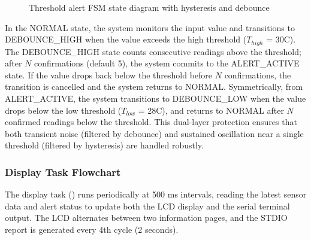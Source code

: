 \begin{figure}[H]
\centering
{}
\caption{Threshold alert FSM state diagram with hysteresis and debounce}
\label{fig:fsm_threshold}
\end{figure}

In the NORMAL state, the system monitors the input value and transitions to DEBOUNCE\_HIGH when the value exceeds the high threshold ($T_{high}$ = 30\textdegree C). The DEBOUNCE\_HIGH state counts consecutive readings above the threshold; after $N$ confirmations (default 5), the system commits to the ALERT\_ACTIVE state. If the value drops back below the threshold before $N$ confirmations, the transition is cancelled and the system returns to NORMAL. Symmetrically, from ALERT\_ACTIVE, the system transitions to DEBOUNCE\_LOW when the value drops below the low threshold ($T_{low}$ = 28\textdegree C), and returns to NORMAL after $N$ confirmed readings below the threshold. This dual-layer protection ensures that both transient noise (filtered by debounce) and sustained oscillation near a single threshold (filtered by hysteresis) are handled robustly.

\subsubsection{Display Task Flowchart}

The display task () runs periodically at 500 ms intervals, reading the latest sensor data and alert status to update both the LCD display and the serial terminal output. The LCD alternates between two information pages, and the STDIO report is generated every 4th cycle (2 seconds).

